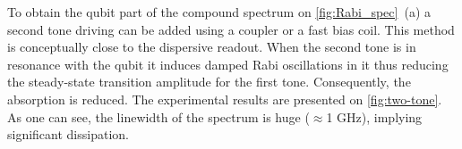 \documentclass[a0, portrait]{a0poster}
\begin{document}
\begin{multicols}{2}
\begin{tcolorbox}[left=1cm, right=1cm, top=0.5cm, bottom=0.5cm, 
                  title={\Large Two-tone spectroscopy}, bottomtitle=.3cm,toptitle=.5cm
                  ]
\begingroup
\setlength{\columnsep}{1cm}	
\begin{multicols}{2}
To obtain the qubit part of the compound spectrum on \autoref{fig:Rabi_spec}~(a) a second tone driving can be added using a coupler or a fast bias coil. This method is conceptually close to the dispersive readout. When the second tone is in resonance with the qubit it induces damped Rabi oscillations in it thus reducing the steady-state transition amplitude for the first tone. Consequently, the absorption is reduced. The experimental results are presented on \autoref{fig:two-tone}. As one can see, the linewidth of the spectrum is huge ($\approx$1 GHz), implying significant dissipation. 
\end{multicols}
\endgroup


\end{tcolorbox}
\end{multicols}
\end{document}
